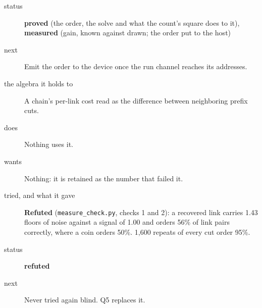 \begin{description}
\item[{status}] \textbf{proved} (the order, the solve and what the count's square does to it), \textbf{measured} (gain, known against drawn; the order put to the host)
\item[{next}] Emit the order to the device once the run channel reaches its addresses.
\end{description}

\begin{description}
\item[{the algebra it holds to}] A chain's per-link cost read as the difference between neighboring prefix cuts.
\item[{does}] Nothing uses it.
\item[{wants}] Nothing: it is retained as the number that failed it.
\item[{tried, and what it gave}] \textbf{Refuted} (\texttt{measure\_\allowbreak{}check.\allowbreak{}py}, checks 1 and 2): a recovered link carries 1.43 floors of noise against a signal of 1.00 and orders 56\% of link pairs correctly, where a coin orders 50\%. 1,600 repeats of every cut order 95\%.
\item[{status}] \textbf{refuted}
\item[{next}] Never tried again blind. Q5 replaces it.
\end{description}

